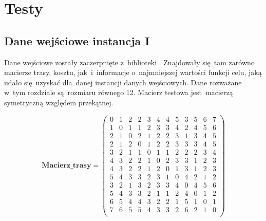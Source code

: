 \chapter{Testy}\label{cha:pierwszyDokument}






\section{Dane wejściowe instancja I}

Dane wejściowe zostały zaczerpnięte z~biblioteki \cite{qaplib}. Znajdowały się~tam zarówno macierze trasy, kosztu, jak~i~informacje o~najmniejszej wartości funkcji celu, jaką udało się~uzyskać dla~danej instancji danych wejściowych. Dane rozważane w~tym rozdziale są~rozmiaru równego 12. Macierz testowa jest~macierzą symetryczną względem przekątnej.
\par
$$
\mathbf{Macierz\_trasy} =
\left( \begin{array}{cccccccccccc}
0& 1& 2& 2& 3& 4& 4& 5& 3& 5& 6& 7\\
1& 0& 1& 1& 2& 3& 3& 4& 2& 4& 5& 6\\
2& 1& 0& 2& 1& 2& 2& 3& 1& 3& 4& 5\\
2& 1& 2& 0&1& 2& 2& 3& 3& 3& 4& 5\\
3& 2& 1& 1& 0& 1& 1& 2& 2& 2& 3& 4\\
4& 3& 2& 2& 1& 0& 2& 3& 3& 1& 2& 3\\
4& 3& 2& 2& 1& 2& 0& 1& 3& 1& 2 & 3\\
5& 4& 3& 3& 2& 3& 1& 0& 4& 2& 1& 2\\
3& 2& 1& 3& 2& 3& 3& 4& 0& 4& 5& 6\\
5& 4& 3& 3& 2& 1& 1& 2& 4& 0& 1& 2\\
6& 5& 4&4& 3& 2& 2& 1& 5& 1& 0& 1\\
7& 6& 5& 5& 4& 3& 3& 2& 6& 2& 1& 0 \\
\end{array} \right)
$$

